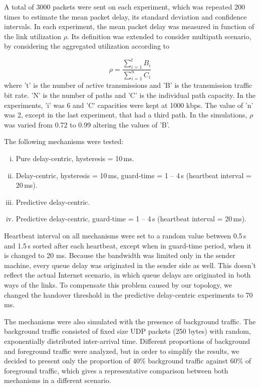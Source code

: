 \documentclass[letterpaper,10pt,oneside,conference,final]{sbrt2015}
\begin{document}
A total of 3000 packets were sent on each experiment, which was repeated 200 times to estimate the mean packet delay, its standard deviation and confidence intervals. In each experiment, the mean packet delay was measured in function of the link utilization $\rho$. Its definition was extended to consider multipath scenario, by considering the aggregated utilization according to 

\begin{equation}
 \rho = \frac{\sum\limits_{i=1}^{t}B_i}{\sum\limits_{i=1}^{n}C_i}
\end{equation}
where 't' is the number of active transmissions and 'B' is the transmission traffic bit rate. 'N' is the number of paths and 'C' is the individual path capacity. In the experiments, 'i' was 6 and 'C' capacities were kept at 1000 kbps. The value of 'n' was 2, except in the last experiment, that had a third path. In the simulations, $\rho$ was varied from 0.72 to 0.99 altering the values of 'B'.

The following mechanisms were tested:
\begin{enumerate}[i)]
 \item Pure delay-centric, hysteresis = 10\,ms.
 \item Delay-centric, hysteresis = 10\,ms, guard-time = 1 -- 4\,s (heartbeat interval = 20\,ms).
 \item Predictive delay-centric.
 \item Predictive delay-centric, guard-time = 1 -- 4\,s (heartbeat interval = 20\,ms).
\end{enumerate}

Heartbeat interval on all mechanisms were set to a random value between 0.5\,s and 1.5\,s sorted after each heartbeat, except when in guard-time period, when it is changed to 20 ms.
Because the bandwidth was limited only in the sender machine, every queue delay was originated in the sender side as well. This doesn't reflect the actual Internet scenario, in which queue delays are originated in both ways of the links. To compensate this problem caused by our topology, we changed the handover threshold in the predictive delay-centric experiments to 70\,ms.

The mechanisms were also simulated with the presence of background traffic. The background traffic consisted of fixed size UDP packets (250 bytes) with random, exponentially distributed inter-arrival time. Different proportions of background and foreground traffic were analyzed, but in order to simplify the results, we decided to present only the proportion of 40\% background traffic against 60\% of foreground traffic, which gives a representative comparison between both mechanisms in a different scenario.
\end{document}
